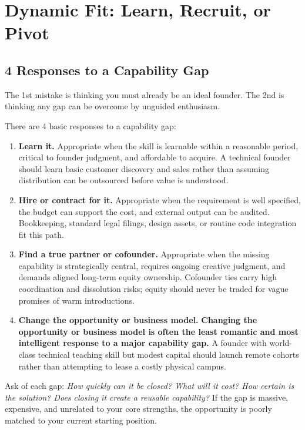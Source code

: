 \section{Dynamic Fit: Learn, Recruit, or Pivot}

\subsection{4 Responses to a Capability Gap}

The 1st mistake is thinking you must already be an ideal founder. The 2nd is thinking any gap can be overcome by unguided enthusiasm.

There are 4 basic responses to a capability gap:

\begin{enumerate}[label=\textbf{\arabic*.},leftmargin=11pt,itemsep=1.5pt,topsep=1.5pt,parsep=0pt]
  \item \textbf{Learn it.} Appropriate when the skill is learnable within a reasonable period, critical to founder judgment, and affordable to acquire. A technical founder should learn basic customer discovery and sales rather than assuming distribution can be outsourced before value is understood.
  \item \textbf{Hire or contract for it.} Appropriate when the requirement is well specified, the budget can support the cost, and external output can be audited. Bookkeeping, standard legal filings, design assets, or routine code integration fit this path.
  \item \textbf{Find a true partner or cofounder.} Appropriate when the missing capability is strategically central, requires ongoing creative judgment, and demands aligned long-term equity ownership. Cofounder ties carry high coordination and dissolution risks; equity should never be traded for vague promises of warm introductions.
  \item \textbf{Change the opportunity or business model.} \textbf{Changing the opportunity or business model is often the least romantic and most intelligent response to a major capability gap.} A founder with world-class technical teaching skill but modest capital should launch remote cohorts rather than attempting to lease a costly physical campus.
\end{enumerate}

Ask of each gap: \textit{How quickly can it be closed? What will it cost? How certain is the solution? Does closing it create a reusable capability?} If the gap is massive, expensive, and unrelated to your core strengths, the opportunity is poorly matched to your current starting position.

